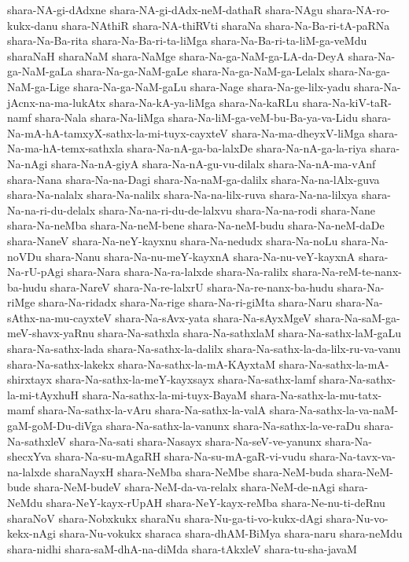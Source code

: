 {shara-NA-gi-dAdxne
shara-NA-gi-dAdx-neM-dathaR
shara-NAgu
shara-NA-ro-kukx-danu
shara-NAthiR
shara-NA-thiRVti
sharaNa
shara-Na-Ba-ri-tA-paRNa
shara-Na-Ba-rita
shara-Na-Ba-ri-ta-liMga
shara-Na-Ba-ri-ta-liM-ga-veMdu
sharaNaH
sharaNaM
shara-NaMge
shara-Na-ga-NaM-ga-LA-da-DeyA
shara-Na-ga-NaM-gaLa
shara-Na-ga-NaM-gaLe
shara-Na-ga-NaM-ga-Lelalx
shara-Na-ga-NaM-ga-Lige
shara-Na-ga-NaM-gaLu
shara-Nage
shara-Na-ge-lilx-yadu
shara-Na-jAcnx-na-ma-lukAtx
shara-Na-kA-ya-liMga
shara-Na-kaRLu
shara-Na-kiV-taR-namf
shara-Nala
shara-Na-liMga
shara-Na-liM-ga-veM-bu-Ba-ya-va-Lidu
shara-Na-mA-hA-tamxyX-sathx-la-mi-tuyx-cayxteV
shara-Na-ma-dheyxV-liMga
shara-Na-ma-hA-temx-sathxla
shara-Na-nA-ga-ba-lalxDe
shara-Na-nA-ga-la-riya
shara-Na-nAgi
shara-Na-nA-giyA
shara-Na-nA-gu-vu-dilalx
shara-Na-nA-ma-vAnf
shara-Nana
shara-Na-na-Dagi
shara-Na-naM-ga-dalilx
shara-Na-na-lAlx-guva
shara-Na-nalalx
shara-Na-nalilx
shara-Na-na-lilx-ruva
shara-Na-na-lilxya
shara-Na-na-ri-du-delalx
shara-Na-na-ri-du-de-lalxvu
shara-Na-na-rodi
shara-Nane
shara-Na-neMba
shara-Na-neM-bene
shara-Na-neM-budu
shara-Na-neM-daDe
shara-NaneV
shara-Na-neY-kayxnu
shara-Na-nedudx
shara-Na-noLu
shara-Na-noVDu
shara-Nanu
shara-Na-nu-meY-kayxnA
shara-Na-nu-veY-kayxnA
shara-Na-rU-pAgi
shara-Nara
shara-Na-ra-lalxde
shara-Na-ralilx
shara-Na-reM-te-nanx-ba-hudu
shara-NareV
shara-Na-re-lalxrU
shara-Na-re-nanx-ba-hudu
shara-Na-riMge
shara-Na-ridadx
shara-Na-rige
shara-Na-ri-giMta
shara-Naru
shara-Na-sAthx-na-mu-cayxteV
shara-Na-sAvx-yata
shara-Na-sAyxMgeV
shara-Na-saM-ga-meV-shavx-yaRnu
shara-Na-sathxla
shara-Na-sathxlaM
shara-Na-sathx-laM-gaLu
shara-Na-sathx-lada
shara-Na-sathx-la-dalilx
shara-Na-sathx-la-da-lilx-ru-va-vanu
shara-Na-sathx-lakekx
shara-Na-sathx-la-mA-KAyxtaM
shara-Na-sathx-la-mA-shirxtayx
shara-Na-sathx-la-meY-kayxsayx
shara-Na-sathx-lamf
shara-Na-sathx-la-mi-tAyxhuH
shara-Na-sathx-la-mi-tuyx-BayaM
shara-Na-sathx-la-mu-tatx-mamf
shara-Na-sathx-la-vAru
shara-Na-sathx-la-valA
shara-Na-sathx-la-va-naM-gaM-goM-Du-diVga
shara-Na-sathx-la-vanunx
shara-Na-sathx-la-ve-raDu
shara-Na-sathxleV
shara-Na-sati
shara-Nasayx
shara-Na-seV-ve-yanunx
shara-Na-shecxYva
shara-Na-su-mAgaRH
shara-Na-su-mA-gaR-vi-vudu
shara-Na-tavx-va-na-lalxde
sharaNayxH
shara-NeMba
shara-NeMbe
shara-NeM-buda
shara-NeM-bude
shara-NeM-budeV
shara-NeM-da-va-relalx
shara-NeM-de-nAgi
shara-NeMdu
shara-NeY-kayx-rUpAH
shara-NeY-kayx-reMba
shara-Ne-nu-ti-deRnu
sharaNoV
shara-Nobxkukx
sharaNu
shara-Nu-ga-ti-vo-kukx-dAgi
shara-Nu-vo-kekx-nAgi
shara-Nu-vokukx
sharaca
shara-dhAM-BiMya
shara-naru
shara-neMdu
shara-nidhi
shara-saM-dhA-na-diMda
shara-tAkxleV
shara-tu-sha-javaM
}
